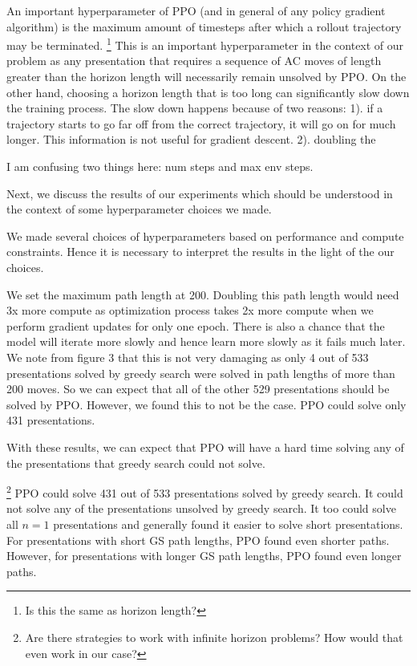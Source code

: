 An important hyperparameter of PPO (and in general of any policy gradient algorithm) is the maximum amount of timesteps after which a rollout trajectory may be terminated.
\footnote{Is this the same as horizon length?}
This is an important hyperparameter in the context of our problem as any presentation that requires a sequence of AC moves of length greater than the horizon length will necessarily remain unsolved by PPO. On the other hand, choosing a horizon length that is too long can significantly slow down the training process. The slow down happens because of two reasons: 1). if a trajectory starts to go far off from the correct trajectory, it will go on for much longer. This information is not useful for gradient descent. 2). doubling the 

I am confusing two things here: num steps and max env steps. 

Next, we discuss the results of our experiments which should be understood in the context of some hyperparameter choices we made. 

We made several choices of hyperparameters based on performance and compute constraints. Hence it is necessary to interpret the results in the light of the our choices.

We set the maximum path length at 200. Doubling this path length would need 3x more compute as optimization process takes 2x more compute when we perform gradient updates for only one epoch. There is also a chance that the model will iterate more slowly and hence learn more slowly as it fails much later. We note from figure 3 that this is not very damaging as only 4 out of 533 presentations solved by greedy search were solved in path lengths of more than 200 moves. So we can expect that all of the other 529 presentations should be solved by PPO. However, we found this to not be the case. PPO could solve only 431 presentations. 

With these results, we can expect that PPO will have a hard time solving any of the presentations that greedy search could not solve. 


\footnote{Are there strategies to work with infinite horizon problems? How would that even work in our case?}
PPO could solve 431 out of 533 presentations solved by greedy search. It could not solve any of the presentations unsolved by greedy search. It too could solve all $n=1$ presentations and generally found it easier to solve short presentations. For presentations with short GS path lengths, PPO found even shorter paths. However, for presentations with longer GS path lengths, PPO found even longer paths. 

